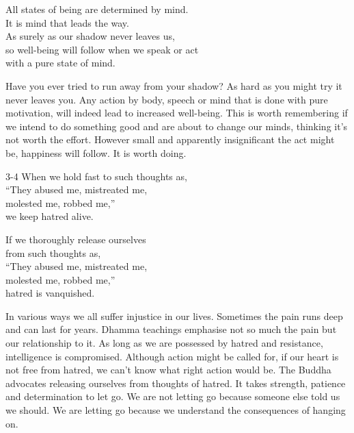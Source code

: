 
\begin{dhpVerse}{2}
\label{dhp-2}
All states of being are determined by mind.\\
It is mind that leads the way.\\
As surely as our shadow never leaves us,\\
so well-being will follow when we speak or act\\
with a pure state of mind.
\end{dhpVerse}

\begin{dhpRefl}

Have you ever tried to run away from your shadow? As hard as you
might try it never leaves you. Any action by body, speech or mind
that is done with pure motivation, will indeed lead to increased
well-being. This is worth remembering if we intend to do something
good and are about to change our minds, thinking it's not worth the
effort. However small and apparently insignificant the act might be,
happiness will follow. It is worth doing.

\end{dhpRefl}


\begin{dhpVerse}{3-4}
\label{dhp-3}\label{dhp-4}
When we hold fast to such thoughts as,\\
``They abused me, mistreated me,\\
molested me, robbed me,''\\
we keep hatred alive.

If we thoroughly release ourselves\\
from such thoughts as,\\
``They abused me, mistreated me,\\
molested me, robbed me,''\\
hatred is vanquished.
\end{dhpVerse}

\begin{dhpRefl}

In various ways we all suffer injustice in our lives. Sometimes the
pain runs deep and can last for years. Dhamma teachings emphasise not
so much the pain but our relationship to it. As long as we are
possessed by hatred and resistance, intelligence is compromised.
Although action might be called for, if our heart is not free from
hatred, we can't know what right action would be. The Buddha
advocates releasing ourselves from thoughts of hatred. It takes
strength, patience and determination to let go. We are not letting go
because someone else told us we should. We are letting go because we
understand the consequences of hanging on.

\end{dhpRefl}

